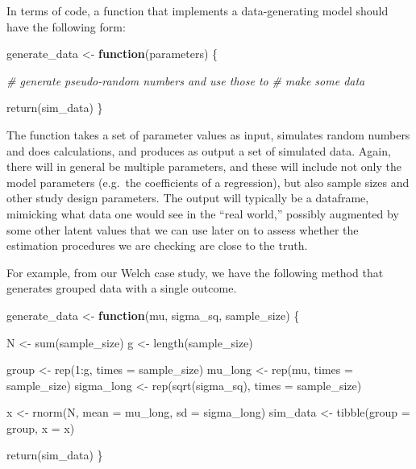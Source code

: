 \documentclass[
]{book}
\newenvironment{Shaded}{\begin{snugshade}}{\end{snugshade}}
\newcommand{\AttributeTok}[1]{\textcolor[rgb]{0.77,0.63,0.00}{#1}}
\newcommand{\CommentTok}[1]{\textcolor[rgb]{0.56,0.35,0.01}{\textit{#1}}}
\newcommand{\ControlFlowTok}[1]{\textcolor[rgb]{0.13,0.29,0.53}{\textbf{#1}}}
\newcommand{\DecValTok}[1]{\textcolor[rgb]{0.00,0.00,0.81}{#1}}
\newcommand{\FunctionTok}[1]{\textcolor[rgb]{0.00,0.00,0.00}{#1}}
\newcommand{\NormalTok}[1]{#1}
\newcommand{\OtherTok}[1]{\textcolor[rgb]{0.56,0.35,0.01}{#1}}
\newcommand{\SpecialCharTok}[1]{\textcolor[rgb]{0.00,0.00,0.00}{#1}}
\begin{document}
In terms of code, a function that implements a data-generating model should have the following form:

\begin{Shaded}
\begin{Highlighting}[]
\NormalTok{generate\_data }\OtherTok{\textless{}{-}} \ControlFlowTok{function}\NormalTok{(parameters) \{}

  \CommentTok{\# generate pseudo{-}random numbers and use those to}
  \CommentTok{\# make some data}
  
  \FunctionTok{return}\NormalTok{(sim\_data)}
\NormalTok{\}}
\end{Highlighting}
\end{Shaded}

The function takes a set of parameter values as input, simulates random numbers and does calculations, and produces as output a set of simulated data.
Again, there will in general be multiple parameters, and these will include not only the model parameters (e.g.~the coefficients of a regression), but also sample sizes and other study design parameters.
The output will typically be a dataframe, mimicking what data one would see in the ``real world,'' possibly augmented by some other latent values that we can use later on to assess whether the estimation procedures we are checking are close to the truth.

For example, from our Welch case study, we have the following method that generates grouped data with a single outcome.

\begin{Shaded}
\begin{Highlighting}[]
\NormalTok{generate\_data }\OtherTok{\textless{}{-}} \ControlFlowTok{function}\NormalTok{(mu, sigma\_sq, sample\_size) \{}

\NormalTok{  N }\OtherTok{\textless{}{-}} \FunctionTok{sum}\NormalTok{(sample\_size) }
\NormalTok{  g }\OtherTok{\textless{}{-}} \FunctionTok{length}\NormalTok{(sample\_size) }
  
\NormalTok{  group }\OtherTok{\textless{}{-}} \FunctionTok{rep}\NormalTok{(}\DecValTok{1}\SpecialCharTok{:}\NormalTok{g, }\AttributeTok{times =}\NormalTok{ sample\_size) }
\NormalTok{  mu\_long }\OtherTok{\textless{}{-}} \FunctionTok{rep}\NormalTok{(mu, }\AttributeTok{times =}\NormalTok{ sample\_size)}
\NormalTok{  sigma\_long }\OtherTok{\textless{}{-}} \FunctionTok{rep}\NormalTok{(}\FunctionTok{sqrt}\NormalTok{(sigma\_sq), }\AttributeTok{times =}\NormalTok{ sample\_size) }
  
\NormalTok{  x }\OtherTok{\textless{}{-}} \FunctionTok{rnorm}\NormalTok{(N, }\AttributeTok{mean =}\NormalTok{ mu\_long, }\AttributeTok{sd =}\NormalTok{ sigma\_long)}
\NormalTok{  sim\_data }\OtherTok{\textless{}{-}} \FunctionTok{tibble}\NormalTok{(}\AttributeTok{group =}\NormalTok{ group, }\AttributeTok{x =}\NormalTok{ x)}
    
  \FunctionTok{return}\NormalTok{(sim\_data)}
\NormalTok{\}}
\end{Highlighting}
\end{Shaded}
\end{document}
